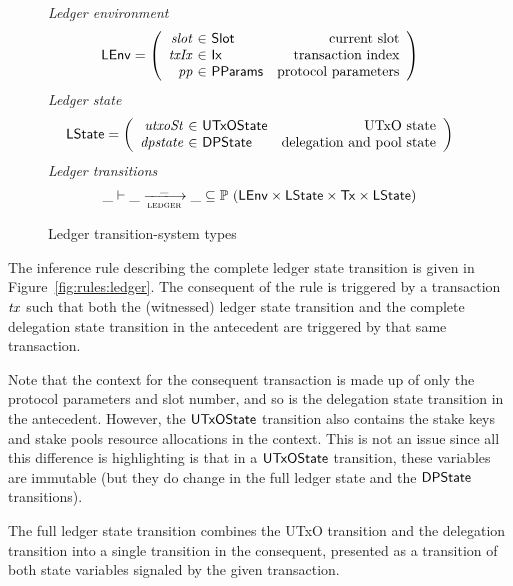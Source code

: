\documentclass[11pt,a4paper,dvipsnames]{article}
\newcommand{\Tx}{\type{Tx}}
\newcommand{\Ix}{\type{Ix}}
\newcommand{\PParams}{\type{PParams}}
\newcommand{\Slot}{\type{Slot}}
\newcommand{\UTxOState}{\ensuremath{\type{UTxOState}}}
\newcommand{\DPState}{\type{DPState}}
\newcommand{\LEnv}{\type{LEnv}}
\newcommand{\LState}{\type{LState}}
\theoremstyle{definition}
\theoremstyle{definition}
\begin{document}
\begin{figure}
  \emph{Ledger environment}
  \begin{equation*}
    \LEnv =
    \left(
      \begin{array}{r@{~\in~}lr}
        \var{slot} & \Slot & \text{current slot}\\
        \var{txIx} & \Ix & \text{transaction index}\\
        \var{pp} & \PParams & \text{protocol parameters}\\
      \end{array}
    \right)
  \end{equation*}
  \emph{Ledger state}
  \begin{equation*}
    \LState =
    \left(
      \begin{array}{r@{~\in~}lr}
        \var{utxoSt} & \UTxOState & \text{UTxO state}\\
        \var{dpstate} & \DPState & \text{delegation and pool state}\\
      \end{array}
    \right)
  \end{equation*}
  \emph{Ledger transitions}
  \begin{equation*}
    \_ \vdash
    \var{\_} \trans{ledger}{\_} \var{\_}
    \subseteq \powerset (\LEnv \times \LState \times \Tx \times \LState)
  \end{equation*}
  \caption{Ledger transition-system types}
  \label{fig:ts-types:ledger}
\end{figure}


The inference rule describing the complete ledger state transition is given in
Figure~\ref{fig:rules:ledger}. The consequent of the rule is triggered by
a transaction $\mathit{tx}$ such that both the (witnessed) ledger state transition
and the complete delegation state transition in the antecedent are
triggered by that same transaction.

Note that the context for the consequent transaction is made up of only the
protocol parameters and slot number, and so is the delegation state transition in
the antecedent. However, the $\UTxOState$ transition also contains the
stake keys and stake pools resource allocations in the context. This is not
an issue since all this difference is highlighting is that in a $\UTxOState$
transition, these variables are immutable (but they do change in the full
ledger state and the $\DPState$ transitions).

The full ledger state transition combines the UTxO transition and the
delegation transition into a single transition
in the consequent, presented as a transition of both state variables signaled
by the given transaction.
\end{document}
